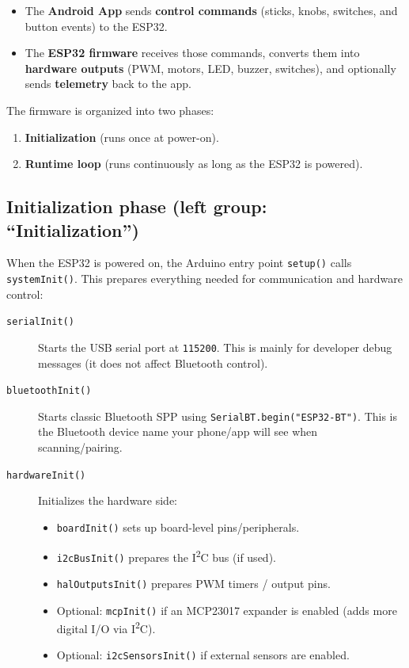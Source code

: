 \documentclass[a3paper,11pt]{article}
\begin{document}
\begin{itemize}
	\item The \textbf{Android App} sends \textbf{control commands} (sticks, knobs, switches, and button events) to the ESP32.
	\item The \textbf{ESP32 firmware} receives those commands, converts them into \textbf{hardware outputs} (PWM, motors, LED, buzzer, switches), and optionally sends \textbf{telemetry} back to the app.
\end{itemize}

The firmware is organized into two phases:
\begin{enumerate}
	\item \textbf{Initialization} (runs once at power-on).
	\item \textbf{Runtime loop} (runs continuously as long as the ESP32 is powered).
\end{enumerate}

\subsection{Initialization phase (left group: ``Initialization'')}
When the ESP32 is powered on, the Arduino entry point \texttt{setup()} calls \texttt{systemInit()}.
This prepares everything needed for communication and hardware control:

\begin{description}
	\item[\texttt{serialInit()}] Starts the USB serial port at \texttt{115200}.
	      This is mainly for developer debug messages (it does not affect Bluetooth control).

	\item[\texttt{bluetoothInit()}] Starts classic Bluetooth SPP using \texttt{SerialBT.begin("ESP32-BT")}.
	      This is the Bluetooth device name your phone/app will see when scanning/pairing.

	\item[\texttt{hardwareInit()}] Initializes the hardware side:
	      \begin{itemize}
		      \item \texttt{boardInit()} sets up board-level pins/peripherals.
		      \item \texttt{i2cBusInit()} prepares the I\textsuperscript{2}C bus (if used).
		      \item \texttt{halOutputsInit()} prepares PWM timers / output pins.
		      \item Optional: \texttt{mcpInit()} if an MCP23017 expander is enabled (adds more digital I/O via I\textsuperscript{2}C).
		      \item Optional: \texttt{i2cSensorsInit()} if external sensors are enabled.
	      \end{itemize}
\end{description}
\end{document}
